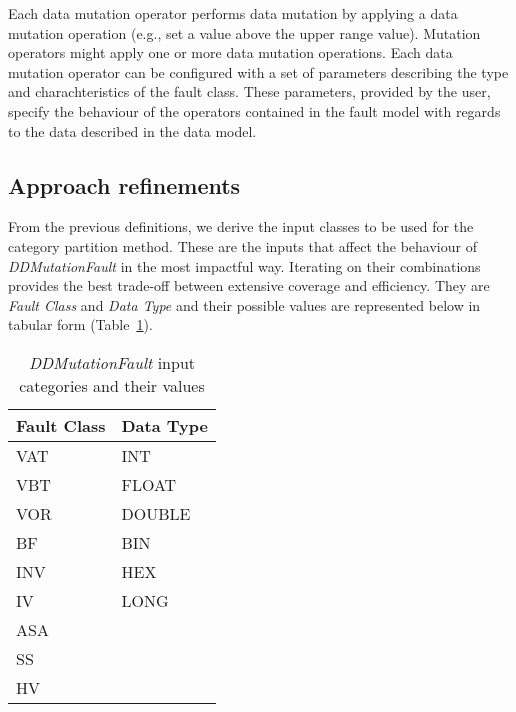 

Each data mutation operator performs data mutation by applying a data mutation operation (e.g., set a value above the upper range value).
Mutation operators might apply one or more data mutation operations.
Each data mutation operator can be configured with a set of parameters describing the type and charachteristics of the fault class. These parameters, provided by the user, specify the behaviour of the operators contained in the fault model with regards to the data described in the data model.


\clearpage

\subsection{Approach refinements}

From the previous definitions, we derive the input classes to be used for the category partition method.
These are the inputs that affect the behaviour of \emph{DDMutationFault} in the most impactful way.
Iterating on their combinations provides the best trade-off between extensive coverage and efficiency.
They are \emph{Fault Class} and \emph{Data Type} and their possible values are represented below in tabular form (Table~\ref{table:ddmutation1_categories}).

\begin{table}[h!]
  \scriptsize
  \centering
  \caption{\emph{DDMutationFault} input categories and their values}
  \label{table:ddmutation1_categories}
\begin{tabular}{@{}ll@{}}
  \toprule
\textbf{Fault Class} & \textbf{Data Type} \\ \midrule
VAT           & INT       \\
VBT           & FLOAT     \\
VOR           & DOUBLE    \\
BF            & BIN       \\
INV           & HEX       \\
IV            & LONG      \\
ASA           &           \\
SS            &           \\
HV            &           \\ \bottomrule
\end{tabular}
\end{table}

